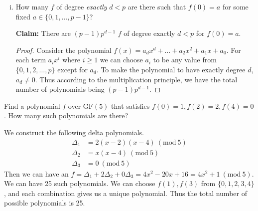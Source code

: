 \documentclass[11pt]{article}
\newcommand{\Mod}[1]{\ (\mathrm{mod}\ #1)}
\begin{document}
\begin{Parts}
\begin{enumerate}[(i)]
        \item How many $f$ of degree \textit{exactly} $d<p$ are there such that 
            $f(0) = a$ for some fixed $a\in\{0,1,\dots,p-1\}$?
        \begin{Answer}
            \textbf{Claim:} There are $(p - 1)p^{d-1}$ $f$ of degree exactly $d < p$ for $f(0) = a$. 
            \begin{proof}
                Consider the polynomial $f(x) = a_dx^d + \ldots + a_2x^2 + a_1x + a_0$. For each term $a_ix^i$ where $i \geq 1$ we can choose $a_i$ 
                to be any value from $\{0,1,2,\ldots,p\}$ except for $a_d$. To make the polynomial to have exactly degree $d$, $a_d \neq 0$. Thus 
                according to the multiplication principle, we have the total number of polynomials being $(p-1)p^{d-1}$. 
            \end{proof}
        \end{Answer}
    \end{enumerate}

    \Part Find a polynomial $f$ over $\mathrm{GF}(5)$ that satisfies 
    $f(0) = 1, f(2) = 2, f(4) = 0$. How many such polynomials are there?
    \begin{Answer}
        We construct the following delta polynomials.
        \begin{align*}
            \Delta_1 &= 2(x - 2)(x - 4) \Mod{5} \\
            \Delta_2 &= x(x - 4) \Mod{5} \\
            \Delta_3 &= 0 \Mod{5}
        \end{align*} 
        Then we can have an $f = \Delta_1 + 2\Delta_2 + 0\Delta_3 = 4x^2 - 20x + 16 = 4x^2 + 1 \Mod{5}$. \\
        We can have 25 such polynomials. We can choose $f(1),f(3)$ from $\{0,1,2,3,4\}$, and each combination gives us a unique polynomial. Thus
        the total number of possible polynomials is 25. 
    \end{Answer}
\end{Parts}

\newpage
{}
\end{document}
